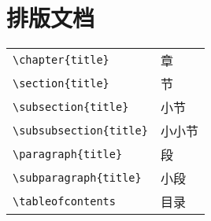 \section{排版文档}
%
\begin{table}[h]
	\centering
	\begin{minipage}[t]{0.46\textwidth}
		\centering
		\begin{tabular}{l l}
			\hline
			\verb|\chapter{|{\color{gray}\verb|title|}\verb|}|       & 章 \\
			\verb|\section{|{\color{gray}\verb|title|}\verb|}|       & 节 \\
			\verb|\subsection{|{\color{gray}\verb|title|}\verb|}|    & 小节 \\
			\verb|\subsubsection{|{\color{gray}\verb|title|}\verb|}| & 小小节 \\
			\verb|\paragraph{|{\color{gray}\verb|title|}\verb|}|     & 段 \\
			\verb|\subparagraph{|{\color{gray}\verb|title|}\verb|}|  & 小段 \\
			\verb|\tableofcontents|                                  & 目录 \\
			\hline
		\end{tabular}
	\end{minipage}
	\qquad
	\begin{minipage}[t]{0.46\textwidth}
		\centering
		\begin{tabular}{l l}
			\hline
			\hline
		\end{tabular}
	\end{minipage}
\end{table}

\newpage
\layout
%

